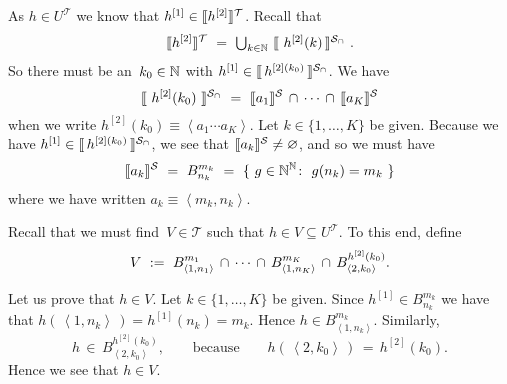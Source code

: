 \documentclass[main.tex]{subfiles}
\begin{document}
As $h\in U^{\mathcal{T}}$
we know that $h^{[1]} \in \decode{h^{[2]}}^{\mathcal{T}}$.
Recall that
\begin{equation*}
\decode{h^{[2]}}^{\mathcal{T}}
\ =\  \textstyle{\bigcup_{k\in \N}} \ 
\decode{\ h^{[2]}(k)\,}^{\mathcal{S}_\cap\ }.
\end{equation*}
So there must be an~$k_0 \in \mathbb{N}$ with 
$h^{[1]} \in \decode{\,h^{[2](k_0)}\,}^{\mathcal{S}_\cap}$.
We have
\begin{equation*}
\decode{\ h^{[2]}(k_0)\ }^{\mathcal{S}_\cap}
\ =\ 
\decode{a_1}^{\mathcal{S}}
\,\cap\,\dotsb\,\cap\,
\decode{a_K}^{\mathcal{S}}
\end{equation*}
when we write $h^{[2]}(k_0)\equiv\left< a_1 \dotsb a_K\right>$.
Let $k\in \{1,\dotsc,K\}$ be given.
Because we have 
$h^{[1]} \in \decode{\,h^{[2](k_0)}\,}^{\mathcal{S}_\cap}$,
we  see that $\decode{a_k}^{\mathcal{S}} \neq\varnothing$,
and so we must have
\begin{equation*}
\decode{a_k}^{\mathcal{S}} \ =\  B^{m_k}_{n_k}  
\ = \ \{\ g\in\N^\N\colon \ g(n_k) = m_k\ \}
\end{equation*}
where we have written $a_k \equiv \left<m_k,n_k\right>$.

Recall that we must find~$V\in\mathcal{T}$
such that $h\in V\subseteq U^{\mathcal{T}}$.
To this end, define
\begin{equation*}
V \ \eqdf \ B^{m_1}_{\left<1,n_1\right>} 
  \,\cap\,\dotsb\,\cap\,
B^{m_K}_{\left<1,n_K\right>}\,\cap\,
B^{h^{[2]}(k_0)}_{\left<2,k_0\right>}.
\end{equation*}

Let us prove that $h\in V$.
Let $k\in\{1,\dotsc,K\}$ be given.
Since $h^{[1]} \in B^{m_k}_{n_k}$
we have that $h(\,\left<1,n_k\right>\,) = h^{[1]}(n_k) = m_k$.
Hence $h\in B^{m_k}_{\left<1,n_k\right>}$.
Similarly, 
\begin{equation*}
h\,\in\, B^{h^{[2]}(k_0)}_{\left<2,k_0\right>},
\qquad\text{because}\qquad h(\,\left<2,k_0\right>\,)\,=\, h^{[2]}(k_0).
\end{equation*}
Hence we see that $h\in V$.
\end{document}
